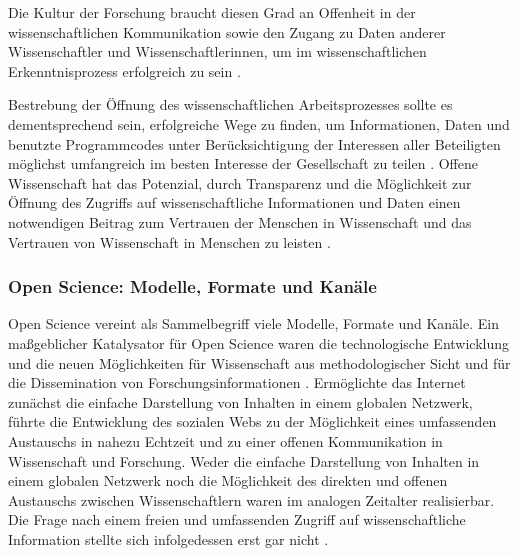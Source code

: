 Die Kultur der Forschung braucht diesen Grad an Offenheit in der wissenschaftlichen Kommunikation sowie den Zugang zu Daten anderer Wissenschaftler und Wissenschaftlerinnen, um im wissenschaftlichen Erkenntnisprozess erfolgreich zu sein \cite{Fecher_2015} \cite{Krumholz_2014} \cite{Patlak_2010}.

Bestrebung der Öffnung des wissenschaftlichen Arbeitsprozesses sollte es dementsprechend sein, erfolgreiche Wege zu finden, um Informationen, Daten und benutzte Programmcodes unter Berücksichtigung der Interessen aller Beteiligten möglichst umfangreich im besten Interesse der Gesellschaft zu teilen \cite{Naeder_2010} \cite{Ross_2013} \cite{Hey_2015}. Offene Wissenschaft hat das Potenzial, durch Transparenz und die Möglichkeit zur Öffnung des Zugriffs auf wissenschaftliche Informationen und Daten einen notwendigen Beitrag zum Vertrauen der Menschen in Wissenschaft und das Vertrauen von Wissenschaft in Menschen zu leisten \cite{Grand_2012}.

\subsubsection{Open Science: Modelle, Formate und Kanäle}

Open Science vereint als Sammelbegriff viele Modelle, Formate und Kanäle. Ein maßgeblicher Katalysator für Open Science waren die technologische Entwicklung und die neuen Möglichkeiten für Wissenschaft aus methodologischer Sicht und für die Dissemination von Forschungsinformationen \cite{Garcia_2010}. Ermöglichte das Internet zunächst die einfache Darstellung von Inhalten in einem globalen Netzwerk, führte die Entwicklung des sozialen Webs zu der Möglichkeit eines umfassenden Austauschs in nahezu Echtzeit und zu einer offenen Kommunikation in Wissenschaft und Forschung. Weder die einfache Darstellung von Inhalten in einem globalen Netzwerk noch die Möglichkeit des direkten und offenen Austauschs zwischen Wissenschaftlern waren im analogen Zeitalter realisierbar. Die Frage nach einem freien und umfassenden Zugriff auf wissenschaftliche Information stellte sich infolgedessen erst gar nicht \cite{Schirmbacher_2007}.

